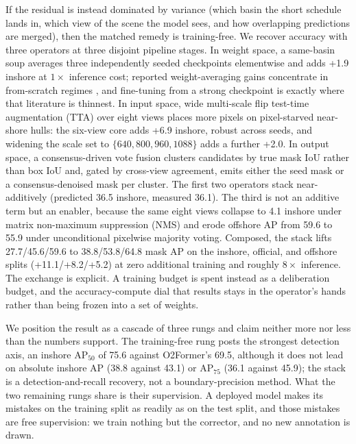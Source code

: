 If the residual is instead dominated by variance (which basin the short schedule lands in, which view of the scene the model sees, and how overlapping predictions are merged), then the matched remedy is training-free. We recover accuracy with three operators at three disjoint pipeline stages. In weight space, a same-basin soup averages three independently seeded checkpoints elementwise \cite{modelsoups2022} and adds +1.9 inshore at $1\times$ inference cost; reported weight-averaging gains concentrate in from-scratch regimes \cite{switchema2024,weightavg2025}, and fine-tuning from a strong checkpoint is exactly where that literature is thinnest. In input space, wide multi-scale flip test-time augmentation (TTA) over eight views places more pixels on pixel-starved near-shore hulls: the six-view core adds +6.9 inshore, robust across seeds, and widening the scale set to $\{640, 800, 960, 1088\}$ adds a further +2.0. In output space, a consensus-driven vote fusion clusters candidates by true mask IoU rather than box IoU and, gated by cross-view agreement, emits either the seed mask or a consensus-denoised mask per cluster. The first two operators stack near-additively (predicted 36.5 inshore, measured 36.1). The third is not an additive term but an enabler, because the same eight views collapse to 4.1 inshore under matrix non-maximum suppression (NMS) and erode offshore AP from 59.6 to 55.9 under unconditional pixelwise majority voting. Composed, the stack lifts 27.7/45.6/59.6 to 38.8/53.8/64.8 mask AP on the inshore, official, and offshore splits (+11.1/+8.2/+5.2) at zero additional training and roughly $8\times$ inference. The exchange is explicit. A training budget is spent instead as a deliberation budget, and the accuracy-compute dial that results stays in the operator's hands rather than being frozen into a set of weights.

We position the result as a cascade of three rungs and claim neither more nor less than the numbers support. The training-free rung posts the strongest detection axis, an inshore AP$_{50}$ of 75.6 against O2Former's 69.5, although it does not lead on absolute inshore AP (38.8 against 43.1) or AP$_{75}$ (36.1 against 45.9); the stack is a detection-and-recall recovery, not a boundary-precision method. What the two remaining rungs share is their supervision. A deployed model makes its mistakes on the training split as readily as on the test split, and those mistakes are free supervision: we train nothing but the corrector, and no new annotation is drawn.

